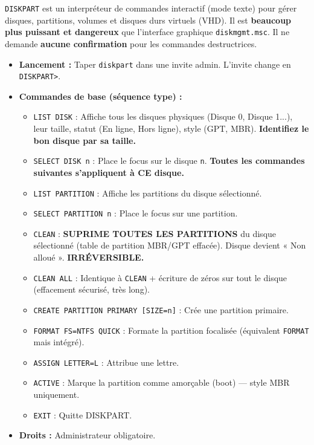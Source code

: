 \documentclass[11pt]{article}
\begin{document}
\begin{propriete}
\texttt{DISKPART} est un interpréteur de commandes interactif (mode texte) pour gérer disques, partitions, volumes et disques durs virtuels (VHD). Il est \textbf{beaucoup plus puissant et dangereux} que l'interface graphique \texttt{diskmgmt.msc}. Il ne demande \textbf{aucune confirmation} pour les commandes destructrices.
\begin{itemize}
    \item \textbf{Lancement :} Taper \texttt{diskpart} dans une invite admin. L'invite change en \texttt{DISKPART>}.
    \item \textbf{Commandes de base (séquence type) :}
    \begin{itemize}
        \item \texttt{LIST DISK} : Affiche tous les disques physiques (Disque 0, Disque 1...), leur taille, statut (En ligne, Hors ligne), style (GPT, MBR). \textbf{Identifiez le bon disque par sa taille.}
        \item \texttt{SELECT DISK n} : Place le focus sur le disque \texttt{n}. \textbf{Toutes les commandes suivantes s'appliquent à CE disque.}
        \item \texttt{LIST PARTITION} : Affiche les partitions du disque sélectionné.
        \item \texttt{SELECT PARTITION n} : Place le focus sur une partition.
        \item \texttt{CLEAN} : \textbf{SUPRIME TOUTES LES PARTITIONS} du disque sélectionné (table de partition MBR/GPT effacée). Disque devient « Non alloué ». \textbf{IRRÉVERSIBLE.}
        \item \texttt{CLEAN ALL} : Identique à \texttt{CLEAN} + écriture de zéros sur tout le disque (effacement sécurisé, très long).
        \item \texttt{CREATE PARTITION PRIMARY [SIZE=n]} : Crée une partition primaire.
        \item \texttt{FORMAT FS=NTFS QUICK} : Formate la partition focalisée (équivalent \texttt{FORMAT} mais intégré).
        \item \texttt{ASSIGN LETTER=L} : Attribue une lettre.
        \item \texttt{ACTIVE} : Marque la partition comme amorçable (boot) — style MBR uniquement.
        \item \texttt{EXIT} : Quitte DISKPART.
    \end{itemize}
    \item \textbf{Droits :} Administrateur obligatoire.
\end{itemize}
\end{propriete}
\end{document}
